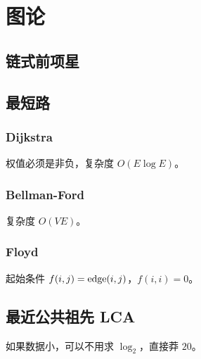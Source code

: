 \chapter{图论}

\section{链式前项星}



\section{最短路}

\subsection{Dijkstra}

权值必须是非负，复杂度 $O(E\log E)$。



\subsection{Bellman-Ford}

复杂度 $O(VE)$。



\subsection{Floyd}

起始条件 $f(i,j)={\rm edge}(i,j)$，$f(i,i)=0$。



\section{最近公共祖先 LCA}

如果数据小，可以不用求 $\log_2$，直接莽 $20$。


